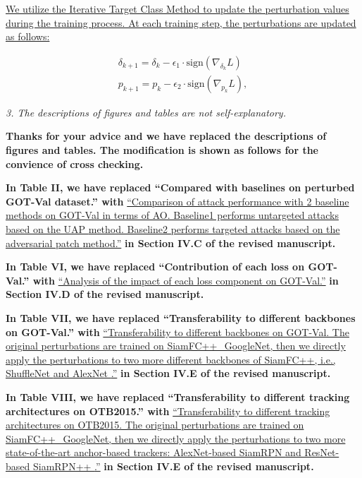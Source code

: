 \documentclass[12pt]{article}
\begin{document}
\uline{
We utilize the Iterative Target Class Method to update the perturbation values during the training process. At each training step, the perturbations are updated as follows:}

\begin{gather}
  \delta_{k+1} = \delta_{k} - \epsilon_1 \cdot \text{sign}(\nabla_{\delta_k}L)\\
  p_{k+1} = p_{k} - \epsilon_2 \cdot \text{sign}(\nabla_{p_k}L),
  \end{gather}

\textit{3. The descriptions of figures and tables are not self-explanatory.}

\textbf{Thanks for your advice and we have replaced the descriptions of figures and tables. The modification is shown as follows for the convience of cross checking.}

\textbf{In Table II, we have replaced ``Compared with baselines on perturbed GOT-Val dataset.'' with}
\uline{``Comparison of attack performance with 2 baseline methods on GOT-Val in terms of AO. Baseline1 performs untargeted attacks based on the UAP \cite{UAP} method. Baseline2 performs targeted attacks based on the adversarial patch \cite{patch} method.''}
\textbf{in Section IV.C of the revised manuscript.}

\textbf{In Table VI, we have replaced ``Contribution of each loss on GOT-Val.'' with}
\uline{``Analysis of the impact of each loss component on GOT-Val.''}
\textbf{in Section IV.D of the revised manuscript.}

\textbf{In Table VII, we have replaced ``Transferability to different backbones on GOT-Val.'' with}
\uline{``Transferability to different backbones on GOT-Val. The original perturbations are trained on SiamFC++\_GoogleNet, then we directly apply the perturbations to two more different backbones of SiamFC++, i.e., ShuffleNet \cite{ShuffleNet} and AlexNet \cite{AlexNet}.''}
\textbf{in Section IV.E of the revised manuscript.}

\textbf{In Table VIII, we have replaced ``Transferability to different tracking architectures on OTB2015.'' with}
\uline{``Transferability to different tracking architectures on OTB2015. The original perturbations are trained on SiamFC++\_GoogleNet, then we directly apply the perturbations to two more state-of-the-art anchor-based trackers: AlexNet-based SiamRPN \cite{SiamRPN} and ResNet-based SiamRPN++ \cite{SiamRPN++}.''}
\textbf{in Section IV.E of the revised manuscript.}
\end{document}
